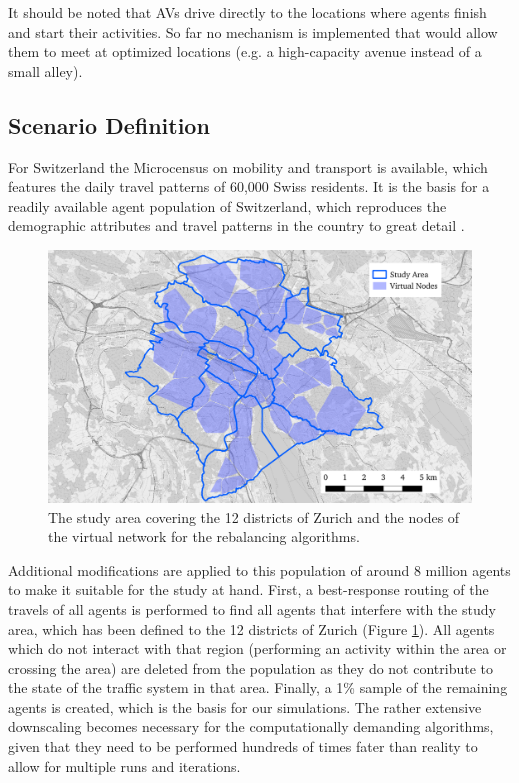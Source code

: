 It should be noted that AVs drive directly to the locations where agents finish and
start their activities. So far no mechanism is implemented that would allow them
to meet at optimized locations (e.g. a high-capacity avenue instead of a small
alley).

\subsection{Scenario Definition}

For Switzerland the Microcensus on mobility and transport \cite{microcensus} is
available, which features the daily travel patterns of 60,000 Swiss residents.
It is the basis for a readily available agent population of
Switzerland, which reproduces the demographic attributes and travel patterns
in the country to great detail \cite{ivtbaseline}.

\begin{figure}[h]
\begin{center}\includegraphics[width=1.0\textwidth]{figures/map.pdf}\end{center}
\caption{The study area covering the 12 districts of Zurich and the nodes of the
virtual network for the rebalancing algorithms.}
\label{fig:study_area_vnodes}
\end{figure}

Additional modifications are applied to this population of around 8 million
agents to make it suitable for the study at hand. First, a best-response routing
of the travels of all agents is performed to find all agents that interfere
with the study area, which has been defined to the 12 districts of Zurich (Figure \ref{fig:study_area_vnodes}).
All agents which do not interact with that region (performing an activity within
the area or crossing the area) are deleted from the population as they do
not contribute to the state of the traffic system in that area. Finally, a 1\%
sample of the remaining agents is created, which is the basis for our
simulations. The rather extensive downscaling becomes necessary for the computationally
demanding algorithms, given that they need to be performed hundreds of times fater
than reality to allow for multiple runs and iterations.

